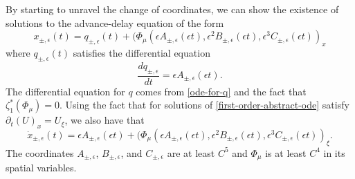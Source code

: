 By starting to unravel the change of coordinates, we can show the existence of solutions to the advance-delay equation of the form
\begin{equation*}
	x_{\pm,\epsilon}(t) = q_{\pm, \epsilon}(t) + (\Phi_\mu(\epsilon A_{\pm, \epsilon}(\epsilon t),\epsilon^2 B_{\pm, \epsilon}(\epsilon t) ,\epsilon^3 C_{\pm, \epsilon}(\epsilon t))_x
\end{equation*}
where \(q_{\pm, \epsilon}(t)\) satisfies the differential equation
\begin{equation*}
	\frac{dq_{\pm, \epsilon}}{dt} =  \epsilon A_{\pm, \epsilon}(\epsilon t).
\end{equation*}
The differential equation for \(q\) comes from \cref{ode-for-q} and the fact that \(\zeta_1^*(\Phi_\mu) = 0\). Using the fact that for solutions of \cref{first-order-abstract-ode} satisfy \(\partial_t (U)_x = U_\xi\), we also have that
\begin{equation*}
	\dot x_{\pm, \epsilon}(t) =  \epsilon A_{\pm, \epsilon}(\epsilon t) + (\Phi_\mu(\epsilon A_{\pm, \epsilon}(\epsilon t),\epsilon^2 B_{\pm, \epsilon}(\epsilon t) ,\epsilon^3 C_{\pm, \epsilon}(\epsilon t))_\xi.
\end{equation*}
The coordinates \(A_{\pm, \epsilon}\), \(B_{\pm, \epsilon}\), and  \(C_{\pm, \epsilon}\) are at least \(C^5\) and \(\Phi_\mu\) is at least \(C^4\) in its spatial variables.

